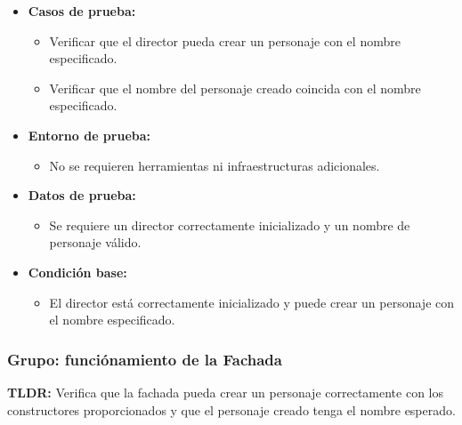 \documentclass{article}
\begin{document}
\begin{itemize}
	\item \textbf{Casos de prueba:}
	\begin{itemize}
		\item Verificar que el director pueda crear un personaje con el nombre especificado.
		\item Verificar que el nombre del personaje creado coincida con el nombre especificado.
	\end{itemize}
	
	\item \textbf{Entorno de prueba:}
	\begin{itemize}
		\item No se requieren herramientas ni infraestructuras adicionales.
	\end{itemize}
	
	\item \textbf{Datos de prueba:}
	\begin{itemize}
		\item Se requiere un director correctamente inicializado y un nombre de personaje válido.
	\end{itemize}
	
	\item \textbf{Condición base:}
	\begin{itemize}
		\item El director está correctamente inicializado y puede crear un personaje con el nombre especificado.
	\end{itemize}
\end{itemize}



\subsubsection{Grupo: funciónamiento de la Fachada}
\textbf{TLDR:} Verifica que la fachada pueda crear un personaje correctamente con los constructores proporcionados y que el personaje creado tenga el nombre esperado.
\end{document}
